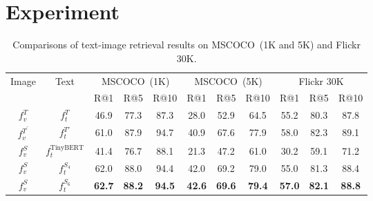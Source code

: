 \section{Experiment}

\begin{table*}[t!]
	
	\centering
	
	\begin{tabular}{cc|ccccccccc}
		
		\toprule
		
		\multirow{2}{*}{Image}&\multirow{2}{*}{Text} & \multicolumn{3}{c}{MSCOCO~(1K)} &\multicolumn{3}{c}{MSCOCO~(5K)}  &\multicolumn{3}{c}{Flickr 30K}  \\
		
		&  &R@1 &R@5  &R@10  &R@1  &R@5  &R@10 &R@1  &R@5  &R@10 \\
		
		\cline{1-11}
		
		
		$f_v^{T}$ & $f_t^{T}$ &46.9  &77.3  &87.3   &28.0  &52.9  &64.5  & 55.2 &80.3  &87.8 \\
		
		$f_v^{T^\prime}$ & $f_t^{T\prime}$ &61.0 &87.9 &94.7 &40.9 &67.6  &77.9 &58.0  &82.3 &89.1  \\
		
		\cline{1-11}
				$f_v^{S}$ & $f_t^{\text{TinyBERT}}$ &41.4 &76.7 &88.1 &21.3 &47.2 &61.0  &30.2  &59.1  &71.2 \\
				$f_v^{S}$ & $f_t^{S_4}$ &62.0&88.0 &94.4 &42.0 &69.2 &79.0  &55.0  &81.3  &88.4\\
				$f_v^{S}$ & $f_t^{S_6}$ &\textbf{62.7} &\textbf{88.2} &\textbf{94.5} &\textbf{42.6} &\textbf{69.6} &\textbf{79.4} &\textbf{57.0} &\textbf{82.1}  &\textbf{88.8}\\
		\bottomrule
	\end{tabular}
	\caption{Comparisons of text-image retrieval results on MSCOCO~(1K and 5K) and Flickr 30K.}
	\label{table:main}
\end{table*}

